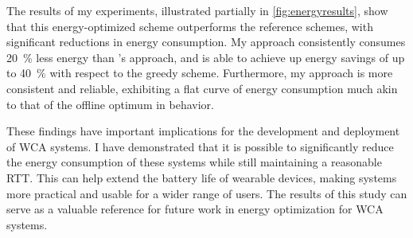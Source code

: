 The results of my experiments, illustrated partially in \cref{fig:energyresults}, show that this energy-optimized scheme outperforms the reference schemes, with significant reductions in energy consumption.
My approach consistently consumes \SI{20}{\percent} less energy than \textcite{wang2019towards}'s approach, and is able to achieve up energy savings of up to \SI{40}{\percent} with respect to the greedy scheme.
Furthermore, my approach is more consistent and reliable, exhibiting a flat curve of energy consumption much akin to that of the offline optimum in behavior.

These findings have important implications for the development and deployment of \gls{WCA} systems.
I have demonstrated that it is possible to significantly reduce the energy consumption of these systems while still maintaining a reasonable \gls{RTT}.
This can help extend the battery life of wearable devices, making  systems more practical and usable for a wider range of users.
The results of this study can serve as a valuable reference for future work in energy optimization for \acl{WCA} systems.

